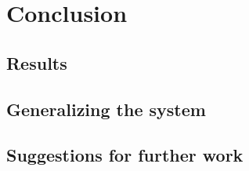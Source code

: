 \chapter{Conclusion}

\label{Chapter5}



\section{Results} %
\label{sec:results}


\section{Generalizing the system} %
\label{sec:generalizing_the_system}


\section{Suggestions for further work} %
\label{sec:suggestions_for_further_work}

